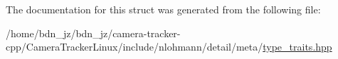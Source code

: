 The documentation for this struct was generated from the following file\+:\begin{DoxyCompactItemize}
\item 
/home/bdn\+\_\+jz/bdn\+\_\+jz/camera-\/tracker-\/cpp/\+Camera\+Tracker\+Linux/include/nlohmann/detail/meta/\hyperlink{type__traits_8hpp}{type\+\_\+traits.\+hpp}\end{DoxyCompactItemize}
